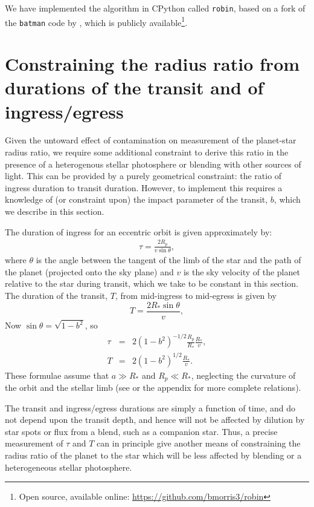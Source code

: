 We have implemented the algorithm in CPython called \texttt{robin}, based on a fork of the \texttt{batman} code by \citet{Kreidberg2015}, which is publicly available\footnote{Open source, available online: \url{https://github.com/bmorris3/robin}}.

\section{Constraining the radius ratio from durations of the transit and of ingress/egress} \label{sec:theory}

Given the untoward effect of contamination on measurement of the planet-star radius ratio,
we require some additional constraint to derive this ratio in the presence of a
heterogenous stellar photosphere or blending with other sources of light.  This
can be provided by a purely geometrical constraint:  the ratio of ingress duration
to transit duration.  However, to implement this requires a knowledge of (or constraint
upon) the impact parameter of the transit, $b$, which we describe in this section.

The duration of ingress for an eccentric orbit  
is given approximately by:
\begin{eqnarray}
 \tau = \frac{2R_p}{v\sin{\theta}},
\end{eqnarray}
where $\theta$ is the angle between the tangent of the limb of the star and the path of
the planet (projected onto the sky plane) and $v$ is the sky velocity of the planet
relative to the star during transit, which we take to be constant in this section.
The duration of the transit, $T$,
from mid-ingress to mid-egress is given by
\begin{equation}
 T = \frac{2R_*\sin{\theta}}{v},   
\end{equation}
Now $\sin{\theta} = \sqrt{1-b^2}$, so
\begin{eqnarray}
 \tau &=& 2(1-b^2)^{-1/2}\frac{R_p}{R_*}\frac{R_*}{v},\\
  T &=& 2(1-b^2)^{1/2}\frac{R_*}{v}.  
\end{eqnarray}
These formulae assume that $a \gg R_*$ and $R_p \ll R_*$, neglecting the curvature
of the orbit and the stellar limb (see \citet{Winn2010} or the appendix for more 
complete relations).

The transit and ingress/egress durations are simply a function of time, and
do not depend upon the transit depth, and hence will not be affected by dilution
by star spots or flux from a blend, such as a companion star.  Thus, a precise
measurement of $\tau$ and $T$ can in principle give another means of constraining
the radius ratio of the planet to the star which will be less affected by
blending or a heterogeneous stellar photosphere.

